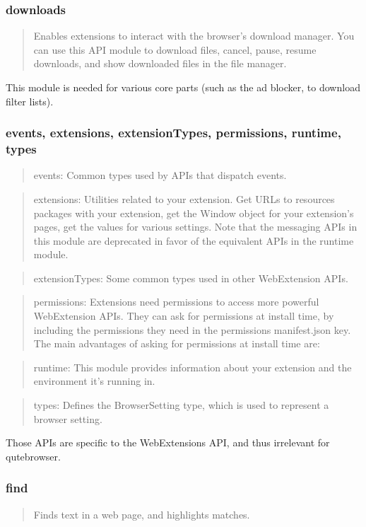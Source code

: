 \documentclass[a4paper,parskip=full,DIV=14,BCOR=15mm]{scrreprt}
\begin{document}
\subsubsection{downloads}
\begin{quote}
Enables extensions to interact with the browser's download manager. You can use this API module to download files, cancel, pause, resume downloads, and show downloaded files in the file manager.
\end{quote}

This module is needed for various core parts (such as the ad blocker, to
download filter lists).

\subsubsection{events, extensions, extensionTypes, permissions, runtime, types}
\begin{quote}
events: Common types used by APIs that dispatch events.
\end{quote}
\begin{quote}
extensions: Utilities related to your extension. Get URLs to resources packages with your extension, get the Window object for your extension's pages, get the values for various settings. Note that the messaging APIs in this module are deprecated in favor of the equivalent APIs in the runtime module.
\end{quote}
\begin{quote}
extensionTypes: Some common types used in other WebExtension APIs.
\end{quote}
\begin{quote}
permissions: Extensions need permissions to access more powerful WebExtension APIs. They can ask for permissions at install time, by including the permissions they need in the permissions manifest.json key. The main advantages of asking for permissions at install time are:
\end{quote}
\begin{quote}
runtime: This module provides information about your extension and the environment it's running in.
\end{quote}
\begin{quote}
types: Defines the BrowserSetting type, which is used to represent a browser setting.
\end{quote}

Those APIs are specific to the WebExtensions API, and thus irrelevant for
qutebrowser.

\subsubsection{find}
\begin{quote}
Finds text in a web page, and highlights matches.
\end{quote}
\end{document}

